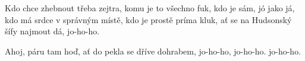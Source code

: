 \beginverse{}
\chordsoff{}
Kdo chce zhebnout třeba zejtra, komu je to všechno fuk,
kdo je sám, jó jako já,
kdo má srdce v správným místě, kdo je prostě príma kluk,
ať se na Hudsonský šífy najmout dá, jo-ho-ho.
\chordson{}
\endverse{}

\beginchorus{}
\chordsoff{}
Ahoj, páru tam hoď, ať do pekla se dříve dohrabem,
jo-ho-ho, jo-ho-ho.
jo-ho-ho.
\chordson{}
\endchorus{}

\endsong{}
